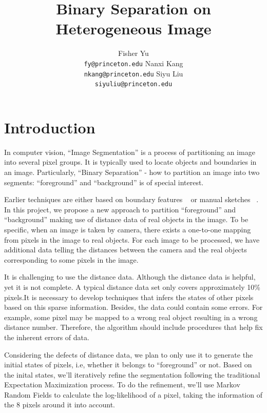 \documentclass{article} %
\title{Binary Separation on Heterogeneous Image}
\author{
Fisher Yu \\
\texttt{fy@princeton.edu}
\And
Nanxi Kang \\
\texttt{nkang@princeton.edu} 
\And
Siyu Liu\\
\texttt{siyuliu@princeton.edu}
}
\begin{document}
\maketitle


\section{Introduction}


In computer vision, ``Image Segmentation'' is a process of partitioning an
image into several pixel groups. It is typically used to locate
objects and boundaries in an image. Particularly, ``Binary Separation'' -
how to partition an image into two segments: ``foreground''
 and ``background'' is of special interest. 

Earlier techniques are either based on boundary features
~\citep{Kass1988snakes} or manual sketches
~\citep{Boykov2006graph}. In this project, we propose a new
approach to partition ``foreground'' and ``background'' making use of 
distance data of real objects in the image. To be specific, when an
image is taken by camera, there exists a
one-to-one mapping from pixels in the image to real objects. 
For each image to be processed, we have additional data telling the 
distances between the camera and the real objects corresponding to some
 pixels in the image. 

It is challenging to use the distance data. Although the distance data
is helpful, yet it is not complete. A typical distance data set only
covers approximately 10\% pixels.It is necessary to develop techniques
that infers the states of other pixels based on this sparse
information. Besides, the data could contain some errors. For example,
some pixel may be mapped to a wrong real object resulting in a wrong
distance number. Therefore, the algorithm should include procedures
that help fix the inherent errors of data. 

Considering the defects of distance data, we plan to only use it to
generate the initial states of pixels, i.e,
 whether it belongs to ``foreground'' or not. Based on the inital
 states, we'll iteratively refine the segmentation following the
 traditional Expectation Maximization process. To do the refinement,
 we'll use Markov Random Fields to calculate the log-likelihood of a
 pixel, taking the information of the 8 pixels around it into account.
\end{document}
